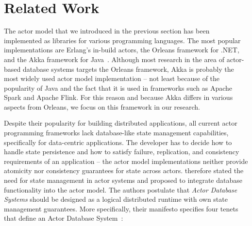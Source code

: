 
\section{Related Work}\label{sec:related_work}

  The actor model that we introduced in the previous section has been implemented as libraries for various programming languages. 
  The most popular implementations are Erlang's in-build actors, the Orleans framework for .NET, and the Akka framework for Java~\cite{armstrong:erlang,akka,bernstein:orleans}.
  Although most research in the area of actor-based database systems targets the Orleans framework, Akka is probably the most widely used actor model implementation -- not least because of the popularity of Java and the fact that it is used in frameworks such as Apache Spark and Apache Flink.
  For this reason and because Akka differs in various aspects from Orleans, we focus on this framework in our research.
  

  Despite their popularity for building distributed applications, all current actor programming frameworks lack database-like state management capabilities, specifically for data-centric applications.
  The developer has to decide how to handle state persistence and how to satisfy failure, replication, and consistency requirements of an application -- the actor model implementations neither provide atomicity nor consistency guarantees for state across actors.
   therefore stated the need for state management in actor systems and proposed to integrate database functionality into the actor model.
  The authors postulate that \textit{Actor Database Systems} should be designed as a logical distributed runtime with own state management guarantees.
  More specifically, their manifesto specifies four tenets that define an Actor Database System~\cite{manifesto}:

